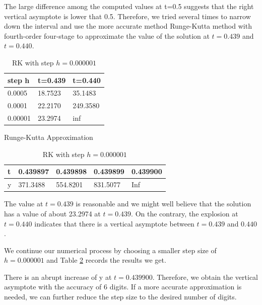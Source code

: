 \documentclass[11pt,a4paper]{article}
\begin{document}
The large difference among the computed values at t=0.5 suggests that the right vertical asymptote is lower that 0.5. Therefore, we tried several times to narrow down the interval and use the more accurate method Runge-Kutta method with fourth-order four-stage to approximate the value of the solution at $t=0.439$ and $t=0.440$.

\begin{table}[H]
	\centering
	\begin{minipage}[b]{0.4\textwidth}
		\begin{center}
			\scriptsize
			\renewcommand{\arraystretch}{1.2}
			\begin{tabular}{l|l|l}
				step h  & t=0.439 & t=0.440  \\
				\hline
				0.0005  & 18.7523 & 35.1483  \\
				\hline
				0.0001  & 22.2170 & 249.3580 \\
				\hline
				0.00001 & 23.2974 & inf     
			\end{tabular}
			\caption{Runge-Kutta Approximation}\label{tab:tab2.2.2}
		\end{center}
	\end{minipage}
	\begin{minipage}[b]{0.4\textwidth}
		\begin{center}
			\scriptsize
			\renewcommand{\arraystretch}{1.2}
			\begin{tabular}{l|l|l|l|l}
				t & 0.439897 & 0.439898 & 0.439899 & 0.439900 \\
				\hline
				y & 371.3488 & 554.8201 & 831.5077 & Inf
			\end{tabular}
			\caption{RK with step $h=0.000001$}\label{tab:tab2.2.3}
		\end{center}

	\end{minipage}
\end{table}

The value at $t=0.439$ is reasonable and we might well believe that the solution has a value of about 23.2974 at $t=0.439$. On the contrary, the explosion at $t=0.440$ indicates that there is a vertical asymptote between $t=0.439$ and $0.440$. 

We continue our numerical process by choosing a smaller step size of $h=0.000001$ and Table \ref{tab:tab2.2.3} records the results we get.

There is an abrupt increase of y at $t=0.439900$. Therefore, we obtain the vertical asymptote with the accuracy of 6 digits. If a more accurate approximation is needed, we can further reduce the step size to the desired number of digits. 
\end{document}
